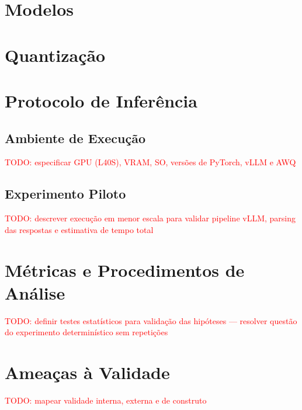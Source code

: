 \section{Modelos}
\label{sec:modelos}

\section{Quantização}
\label{sec:quantizacao}

\section{Protocolo de Inferência}
\label{sec:protocolo}

\subsection{Ambiente de Execução}
\label{sec:ambiente}
\textcolor{red}{TODO: especificar GPU (L40S), VRAM, SO, versões de PyTorch, vLLM e AWQ}

\subsection{Experimento Piloto}
\label{sec:piloto}
\textcolor{red}{TODO: descrever execução em menor escala para validar pipeline vLLM, 
	parsing das respostas e estimativa de tempo total}

\section{Métricas e Procedimentos de Análise}
\label{sec:metricas}
\textcolor{red}{TODO: definir testes estatísticos para validação das hipóteses 
	— resolver questão do experimento determinístico sem repetições}

\section{Ameaças à Validade}
\label{sec:ameacas}
\textcolor{red}{TODO: mapear validade interna, externa e de construto}